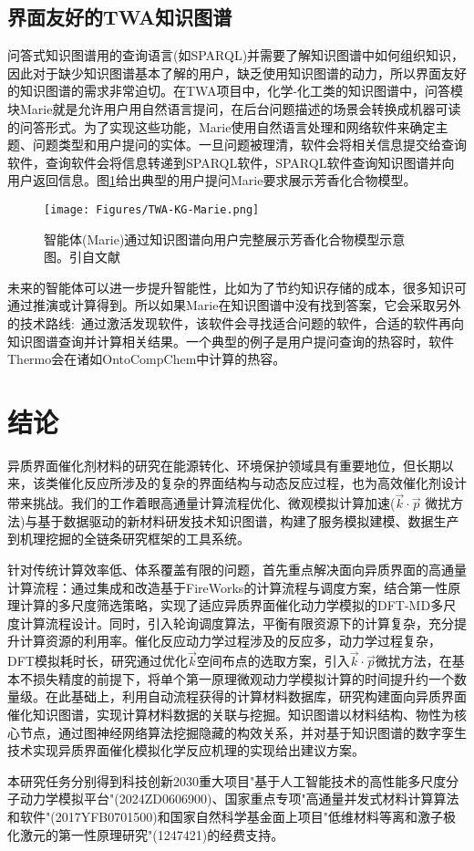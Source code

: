 \subsection{界面友好的\rm{TWA}知识图谱}
问答式知识图谱用的查询语言(如\textrm{SPARQL})并需要了解知识图谱中如何组织知识，因此对于缺少知识图谱基本了解的用户，缺乏使用知识图谱的动力，所以界面友好的知识图谱的需求非常迫切。在\textrm{TWA}项目中，化学-化工类的知识图谱中，问答模块\textrm{Marie}就是允许用户用自然语言提问，在后台问题描述的场景会转换成机器可读的问答形式。为了实现这些功能，\textrm{Marie}使用自然语言处理和网络软件来确定主题、问题类型和用户提问的实体。一旦问题被理清，软件会将相关信息提交给查询软件，查询软件会将信息转递到\textrm{SPARQL}软件，\textrm{SPARQL}软件查询知识图谱并向用户返回信息。图\ref{Fig:TWA-KG-Marie}给出典型的用户提问\textrm{Marie}要求展示芳香化合物模型。
\begin{figure}[h!]
\centering
\texttt{[image: Figures/TWA-KG-Marie.png]}
\caption{\small\textrm{智能体(Marie)通过知识图谱向用户完整展示芳香化合物模型示意图。引自文献~\cite{ACR56-128_2023}}}%
\label{Fig:TWA-KG-Marie}
\end{figure}
未来的智能体可以进一步提升智能性，比如为了节约知识存储的成本，很多知识可通过推演或计算得到。所以如果\textrm{Marie}在知识图谱中没有找到答案，它会采取另外的技术路线:~通过激活发现软件，该软件会寻找适合问题的软件，合适的软件再向知识图谱查询并计算相关结果。一个典型的例子是用户提问查询的热容时，软件\textrm{Thermo}会在诸如\textrm{OntoCompChem}中计算的热容。

\section{结论}
异质界面催化剂材料的研究在能源转化、环境保护领域具有重要地位，但长期以来，该类催化反应所涉及的复杂的界面结构与动态反应过程，也为高效催化剂设计带来挑战。我们的工作着眼高通量计算流程优化、微观模拟计算加速($\vec k\cdot\vec p$ 微扰方法)与基于数据驱动的新材料研发技术知识图谱，构建了服务模拟建模、数据生产到机理挖掘的全链条研究框架的工具系统。

针对传统计算效率低、体系覆盖有限的问题，首先重点解决面向异质界面的高通量计算流程：通过集成和改造基于\textrm{FireWorks}的计算流程与调度方案，结合第一性原理计算的多尺度筛选策略，实现了适应异质界面催化动力学模拟的\textrm{DFT-MD}多尺度计算流程设计。同时，引入轮询调度算法，平衡有限资源下的计算复杂，充分提升计算资源的利用率。催化反应动力学过程涉及的反应多，动力学过程复杂，\textrm{DFT}模拟耗时长，研究通过优化$\vec k$空间布点的选取方案，引入$\vec k\cdot\vec p$微扰方法，在基本不损失精度的前提下，将单个第一原理微观动力学模拟计算的时间提升约一个数量级。在此基础上，利用自动流程获得的计算材料数据库，研究构建面向异质界面催化知识图谱，实现计算材料数据的关联与挖掘。知识图谱以材料结构、物性为核心节点，通过图神经网络算法挖掘隐藏的构效关系，并对基于知识图谱的数字孪生技术实现异质界面催化模拟化学反应机理的实现给出建议方案。

本研究任务分别得到科技创新2030重大项目"基于人工智能技术的高性能多尺度分子动力学模拟平台"(2024ZD0606900)、国家重点专项"高通量并发式材料计算算法和软件"(2017YFB0701500)和国家自然科学基金面上项目"低维材料等离和激子极化激元的第一性原理研究"(1247421)的经费支持。
